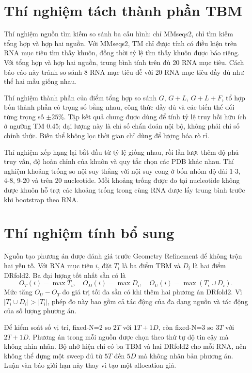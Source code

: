 \documentclass[12pt,a4paper,oneside]{report}
\begin{document}
\section{Thí nghiệm tách thành phần TBM}

Thí nghiệm nguồn tìm kiếm so sánh ba cấu hình: chỉ MMseqs2, chỉ tìm kiếm tổng hợp và hợp
hai nguồn. Với MMseqs2, TM chỉ được tính có điều kiện trên RNA mục tiêu tìm thấy khuôn,
đồng thời tỷ lệ tìm thấy khuôn được
báo riêng. Với tổng hợp và hợp hai nguồn, trung bình tính trên đủ 20 RNA mục tiêu. Cách báo cáo này tránh
so sánh 8 RNA mục tiêu dễ với 20 RNA mục tiêu đầy đủ như thể hai mẫu giống nhau.

Thí nghiệm thành phần của điểm tổng hợp so sánh $G$, $G+L$, $G+L+F$, tổ hợp bốn thành
phần có trọng số bằng nhau, công thức đầy đủ và các biến thể đổi từng trọng số $\pm25\%$.
Tập kết quả chung được
dùng để tính tỷ lệ truy hồi hữu ích ở ngưỡng TM 0.45; đại lượng này là chỉ số chẩn đoán nội bộ, không
phải chỉ số chính thức. Biến thể không lọc thời gian chỉ dùng để lượng hóa rò rỉ.

Thí nghiệm xếp hạng lại bắt đầu từ tỷ lệ giống nhau, rồi lần lượt thêm độ phủ truy vấn,
độ hoàn chỉnh của khuôn và quy tắc chọn các PDB khác nhau. Thí nghiệm khoảng trống so nội
suy thẳng với nội suy cong ở bốn nhóm độ dài 1-3, 4-8, 9-20 và trên 20 nucleotide. Mỗi
khoảng trống được đo tại nucleotide không được khuôn hỗ trợ; các khoảng trống trong cùng
RNA được lấy trung bình trước khi bootstrap theo RNA.

\section{Thí nghiệm tính bổ sung}

Nguồn tạo phương án được đánh giá trước Geometry Refinement để không trộn hai yếu tố. Với
RNA mục tiêu $i$, đặt $T_i$ là ba điểm TBM và $D_i$ là hai điểm DRfold2. Ba đại lượng tốt nhất sẵn có
là
\begin{equation}
O_T(i)=\max T_i,\quad O_D(i)=\max D_i,\quad
O_U(i)=\max(T_i\cup D_i).
\end{equation}
Mức tăng $O_U-O_T$ đo giá trị tối đa sẵn có khi thêm hai phương án DRfold2. Vì
$|T_i\cup D_i|>|T_i|$, phép đo này bao gồm cả tác động của đa dạng nguồn và tác động của
số lượng phương án.

Để kiểm soát số vị trí, fixed-N=2 so $2T$ với $1T+1D$, còn fixed-N=3 so $3T$ với
$2T+1D$. Phương án trong mỗi nguồn được chọn theo thứ tự độ tin cậy mà không nhìn nhãn.
Bộ nhớ hiện chỉ có
ba TBM và hai DRfold2 cho mỗi RNA, nên không thể dựng một sweep đủ từ $5T$ đến $5D$ mà
không nhân bản phương án. Luận văn báo giới hạn này thay vì tạo một allocation giả.
\end{document}
